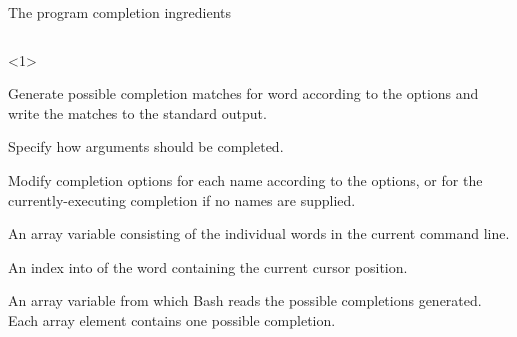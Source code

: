 \begin{frame}{The program completion ingredients}
    \vspace{-6mm}
    \begin{columns}
        \begin{column}{\dimexpr\paperwidth-18mm}
            \begin{onlyenv}<1>
                \begin{description}
                    \setlength{\itemsep}{2mm}
                    \item[\PB{\texttt{compgen}}]
                        Generate possible completion matches for word according to the options and write the matches to the standard output.
                    \item[\PB{\texttt{complete}}]
                        Specify how arguments should be completed.
                    \item[\PB{\texttt{compopt}}]
                        Modify completion options for each name according to the options, or for the currently-executing completion if no names are supplied.\\[6mm]
                    \item[\PB{\texttt{COMP\_WORDS}}]
                        An array variable consisting of the individual words in the current command line.
                    \item[\PB{\texttt{COMP\_CWORD}}]
                        An index into  of the word containing the current cursor position.
                    \item[\PB{\texttt{COMPREPLY}}]
                        An array variable from which Bash reads the possible completions generated. Each array element contains one possible completion.
                \end{description}
            \end{onlyenv}
        \end{column}
    \end{columns}
\end{frame}
